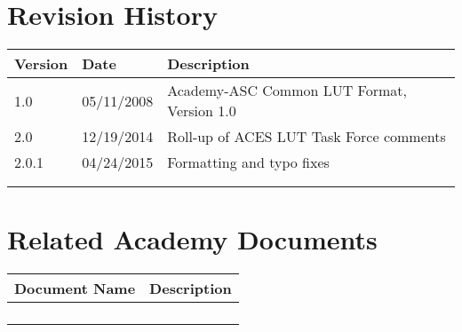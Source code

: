 \prelimsectionformat	%
\chapter{Revision History}

\begin{tabularx}{\linewidth}{|l|l|X|}
    \hline
    Version & Date & Description \\ \hline
    1.0     & 05/11/2008 & Academy-ASC Common LUT Format, Version 1.0      \\ \hline
    2.0     & 12/19/2014 & Roll-up of ACES LUT Task Force comments \\ \hline
    2.0.1   & 04/24/2015 & Formatting and typo fixes \\ \hline
            &      &             \\ \hline
            &      &             \\ \hline
\end{tabularx}

\vspace{0.25in} %
\chapter{Related Academy Documents} %
\begin{tabularx}{\linewidth}{|l|X|}
    \hline
    Document Name & Description  \\ \hline
    & \\ \hline
    & \\ \hline
    & \\ \hline
    & \\ \hline
\end{tabularx}